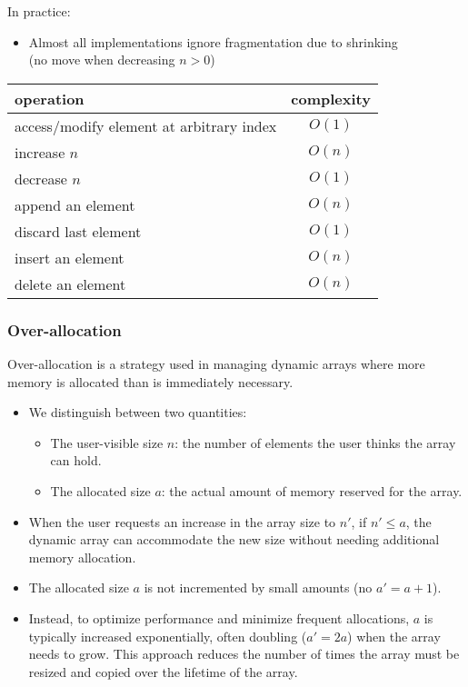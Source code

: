 \documentclass[12pt]{article}
\begin{document}
\noindent In practice:

\begin{itemize}
    \item Almost all implementations ignore fragmentation due to shrinking \\
    (no move when decreasing $n > 0$)
\end{itemize}

\begin{center}
\begin{tabular}{l c}
\hline
operation & complexity \\
\hline
access/modify element at arbitrary index & $O(1)$ \\
increase $n$ & $O(n)$ \\
decrease $n$ & $O(1)$ \\
append an element & $O(n)$ \\
discard last element & $O(1)$ \\
insert an element & $O(n)$ \\
delete an element & $O(n)$ \\
\hline
\end{tabular}
\end{center}

\subsubsection{Over-allocation}
Over-allocation is a strategy used in managing dynamic arrays where more memory is allocated than is immediately necessary.

\begin{itemize}
    \item We distinguish between two quantities:
    \begin{itemize}
        \item The user-visible size \( n \): the number of elements the user thinks the array can hold.
        \item The allocated size \( a \): the actual amount of memory reserved for the array.
    \end{itemize}
    \item When the user requests an increase in the array size to \( n' \), if \( n' \leq a \), the dynamic array can accommodate the new size without needing additional memory allocation.
    \item The allocated size \( a \) is not incremented by small amounts (no \( a' = a + 1 \)).
    \item Instead, to optimize performance and minimize frequent allocations, \( a \) is typically increased exponentially, often doubling (\( a' = 2a \)) when the array needs to grow. This approach reduces the number of times the array must be resized and copied over the lifetime of the array.
\end{itemize}
\end{document}
